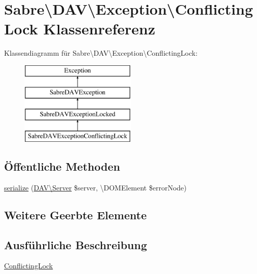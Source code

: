 \hypertarget{class_sabre_1_1_d_a_v_1_1_exception_1_1_conflicting_lock}{}\section{Sabre\textbackslash{}D\+AV\textbackslash{}Exception\textbackslash{}Conflicting\+Lock Klassenreferenz}
\label{class_sabre_1_1_d_a_v_1_1_exception_1_1_conflicting_lock}
Klassendiagramm für Sabre\textbackslash{}D\+AV\textbackslash{}Exception\textbackslash{}Conflicting\+Lock\+:\begin{figure}[H]
\begin{center}
\leavevmode
\includegraphics[height=4.000000cm]{class_sabre_1_1_d_a_v_1_1_exception_1_1_conflicting_lock}
\end{center}
\end{figure}
\subsection*{Öffentliche Methoden}
\begin{DoxyCompactItemize}
\item 
\mbox{\hyperlink{class_sabre_1_1_d_a_v_1_1_exception_1_1_conflicting_lock_ac127ab3185166621adef37268f8a47a5}{serialize}} (\mbox{\hyperlink{class_sabre_1_1_d_a_v_1_1_server}{D\+A\+V\textbackslash{}\+Server}} \$server, \textbackslash{}D\+O\+M\+Element \$error\+Node)
\end{DoxyCompactItemize}
\subsection*{Weitere Geerbte Elemente}


\subsection{Ausführliche Beschreibung}
\mbox{\hyperlink{class_sabre_1_1_d_a_v_1_1_exception_1_1_conflicting_lock}{Conflicting\+Lock}}

